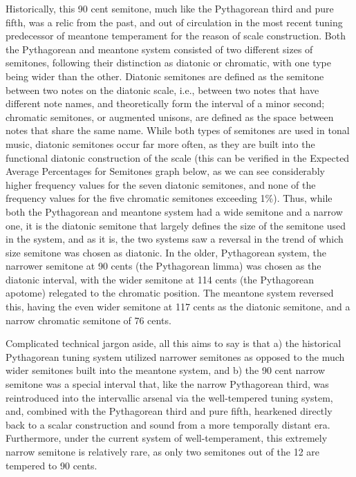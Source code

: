 Historically, this 90 cent semitone, much like the Pythagorean third and
pure fifth, was a relic from the past, and out of circulation in the
most recent tuning predecessor of meantone temperament for the reason of
scale construction. Both the Pythagorean and meantone system consisted
of two different sizes of semitones, following their distinction as
diatonic or chromatic, with one type being wider than the other.
Diatonic semitones are defined as the semitone between two notes on the
diatonic scale, i.e., between two notes that have different note names,
and theoretically form the interval of a minor second; chromatic
semitones, or augmented unisons, are defined as the space between notes
that share the same name. While both types of semitones are used in
tonal music, diatonic semitones occur far more often, as they are built
into the functional diatonic construction of the scale (this can be
verified in the Expected Average Percentages for Semitones graph below,
as we can see considerably higher frequency values for the seven
diatonic semitones, and none of the frequency values for the five
chromatic semitones exceeding 1\%). Thus, while both the Pythagorean and
meantone system had a wide semitone and a narrow one, it is the diatonic
semitone that largely defines the size of the semitone used in the
system, and as it is, the two systems saw a reversal in the trend of
which size semitone was chosen as diatonic. In the older, Pythagorean
system, the narrower semitone at 90 cents (the Pythagorean limma) was
chosen as the diatonic interval, with the wider semitone at 114 cents
(the Pythagorean apotome) relegated to the chromatic position. The
meantone system reversed this, having the even wider semitone at 117
cents as the diatonic semitone, and a narrow chromatic semitone of 76
cents.

Complicated technical jargon aside, all this aims to say is that a) the
historical Pythagorean tuning system utilized narrower semitones as
opposed to the much wider semitones built into the meantone system, and
b) the 90 cent narrow semitone was a special interval that, like the
narrow Pythagorean third, was reintroduced into the intervallic arsenal
via the well-tempered tuning system, and, combined with the Pythagorean
third and pure fifth, hearkened directly back to a scalar construction
and sound from a more temporally distant era. Furthermore, under the
current system of well-temperament, this extremely narrow semitone is
relatively rare, as only two semitones out of the 12 are tempered to 90
cents.


